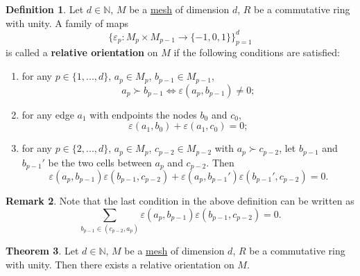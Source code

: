 \documentclass[fleqn]{article}
\theoremstyle{definition}
\newtheorem{theorem}{Theorem}[section]
\newtheorem{definition}[theorem]{Definition}
\newtheorem{remark}[theorem]{Remark}
\newcommand{\N}{\mathbb{N}}
\begin{document}
\begin{definition}
  \label{idec:relative_orientation:definition}
  Let
    $d \in \N$,
    $M$ be a \hyperref[idec:mesh:definition]{mesh} of dimension $d$,
    $R$ be a commutative ring with unity.
  A family of maps
  \begin{equation}
    \{\varepsilon_p \colon M_p \times M_{p - 1} \to \{-1, 0, 1\}\}_{p = 1}^d
  \end{equation}
  is called a \textbf{relative orientation}
  on $M$ if the following conditions are satisfied:
  \begin{enumerate}
    \item
      for any $p \in \{1, ..., d\}$, $a_p \in M_p$, $b_{p - 1} \in M_{p - 1}$,
      \begin{equation}
        a_p \succ b_{p - 1} \Leftrightarrow \varepsilon(a_p, b_{p - 1}) \neq 0;
      \end{equation}
    \item
      for any edge $a_1$ with endpoints the nodes $b_0$ and $c_0$,
      \begin{equation}
        \varepsilon(a_1, b_0) + \varepsilon(a_1, c_0) = 0;
      \end{equation}
    \item
      for any
        $p \in \{2, ..., d\}$,
        $a_p \in M_p$,
        $c_{p - 2} \in M_{p - 2}$ with $a_p \succ c_{p - 2}$,
      let $b_{p - 1}$ and $b_{p - 1}'$ be the two
      cells between $a_p$ and $c_{p - 2}$.
      Then
      \begin{equation}
          \varepsilon(a_p, b_{p - 1}) \varepsilon(b_{p - 1}, c_{p - 2})
        + \varepsilon(a_p, b_{p - 1}') \varepsilon(b_{p - 1}', c_{p - 2}) = 0.
      \end{equation}
  \end{enumerate}
\end{definition}

\begin{remark}
  Note that the last condition in the above definition can be written as
  \begin{equation}
    \sum_{b_{p - 1} \in (c_{p - 2}, a_p)}
    \varepsilon(a_p, b_{p - 1}) \varepsilon(b_{p - 1}, c_{p - 2}) = 0.
  \end{equation}
\end{remark}

\begin{theorem}
  Let
    $d \in \N$,
    $M$ be a \hyperref[idec:mesh:definition]{mesh} of dimension $d$,
    $R$ be a commutative ring with unity.
  Then there exists a relative orientation on $M$.
\end{theorem}
\end{document}
